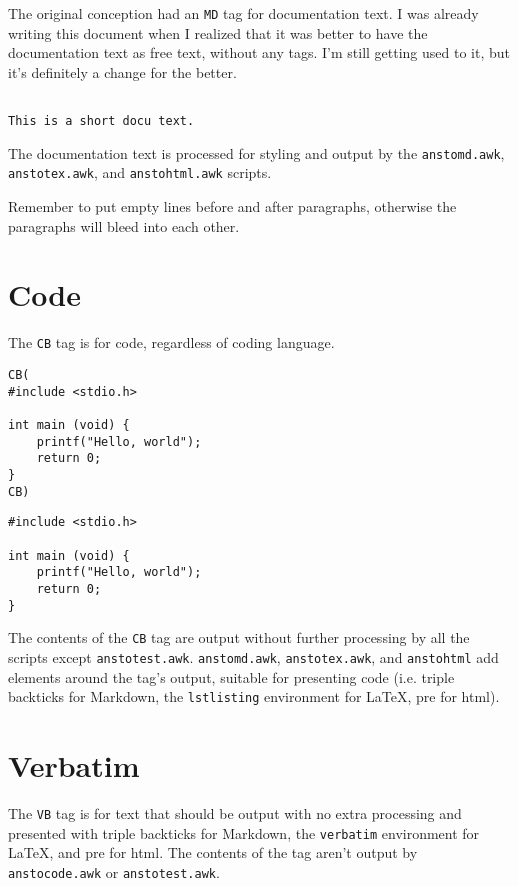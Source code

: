 The original conception had an \texttt{MD} tag for documentation text. I was already writing this document when I realized that it was better to have the documentation text as free text, without any tags. I'm still getting used to it, but it's definitely a change for the better.

\begin{verbatim}

This is a short docu text.

\end{verbatim}

The documentation text is processed for styling and output by the \texttt{anstomd.awk}, \texttt{anstotex.awk}, and \texttt{anstohtml.awk} scripts.


Remember to put empty lines before and after paragraphs, otherwise the paragraphs will bleed into each other.

\section{Code}
\label{code}

The \texttt{CB} tag is for code, regardless of coding language.

\begin{verbatim}
CB(
#include <stdio.h>

int main (void) {
    printf("Hello, world");
    return 0;
}
CB)
\end{verbatim}
\begin{lstlisting}
#include <stdio.h>

int main (void) {
    printf("Hello, world");
    return 0;
}
\end{lstlisting}

The contents of the \texttt{CB} tag are output without further processing by all the scripts except \texttt{anstotest.awk}. \texttt{anstomd.awk}, \texttt{anstotex.awk}, and \texttt{anstohtml} add elements around the tag's output, suitable for presenting code (i.e. triple backticks for Markdown, the \texttt{lstlisting} environment for \LaTeX{}, pre for html).

\section{Verbatim}
\label{verbatim}

The \texttt{VB} tag is for text that should be output with no extra processing and presented with triple backticks for Markdown, the \texttt{verbatim} environment for \LaTeX{}, and pre for html. The contents of the tag aren't output by \texttt{anstocode.awk} or \texttt{anstotest.awk}.

